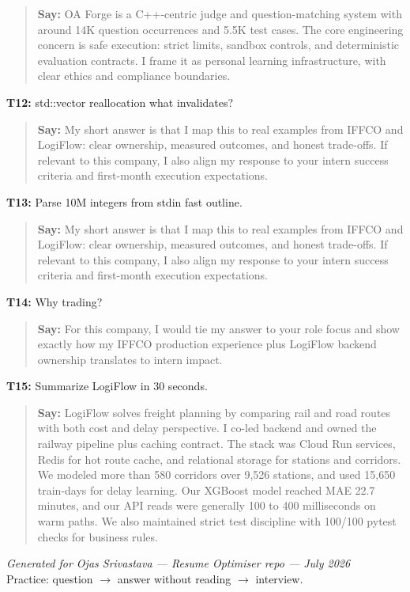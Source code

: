 \documentclass[9pt,a4paper]{article}
\begin{document}
\begin{quote}\small\textbf{Say:} OA Forge is a C++-centric judge and question-matching system with around 14K question occurrences and 5.5K test cases. The core engineering concern is safe execution: strict limits, sandbox controls, and deterministic evaluation contracts. I frame it as personal learning infrastructure, with clear ethics and compliance boundaries.\end{quote}
\vspace{2mm}
\textbf{T12:} std::vector reallocation what invalidates?

\begin{quote}\small\textbf{Say:} My short answer is that I map this to real examples from IFFCO and LogiFlow: clear ownership, measured outcomes, and honest trade-offs. If relevant to this company, I also align my response to your intern success criteria and first-month execution expectations.\end{quote}
\vspace{2mm}
\textbf{T13:} Parse 10M integers from stdin fast outline.

\begin{quote}\small\textbf{Say:} My short answer is that I map this to real examples from IFFCO and LogiFlow: clear ownership, measured outcomes, and honest trade-offs. If relevant to this company, I also align my response to your intern success criteria and first-month execution expectations.\end{quote}
\vspace{2mm}
\textbf{T14:} Why trading?

\begin{quote}\small\textbf{Say:} For this company, I would tie my answer to your role focus and show exactly how my IFFCO production experience plus LogiFlow backend ownership translates to intern impact.\end{quote}
\vspace{2mm}
\textbf{T15:} Summarize LogiFlow in 30 seconds.

\begin{quote}\small\textbf{Say:} LogiFlow solves freight planning by comparing rail and road routes with both cost and delay perspective. I co-led backend and owned the railway pipeline plus caching contract. The stack was Cloud Run services, Redis for hot route cache, and relational storage for stations and corridors. We modeled more than 580 corridors over 9,526 stations, and used 15,650 train-days for delay learning. Our XGBoost model reached MAE 22.7 minutes, and our API reads were generally 100 to 400 milliseconds on warm paths. We also maintained strict test discipline with 100/100 pytest checks for business rules.\end{quote}
\vspace{2mm}

\vfill
\begin{center}
\textit{Generated for Ojas Srivastava --- Resume Optimiser repo --- July 2026}\\
\small Practice: question $\rightarrow$ answer without reading $\rightarrow$ interview.
\end{center}
\end{document}
